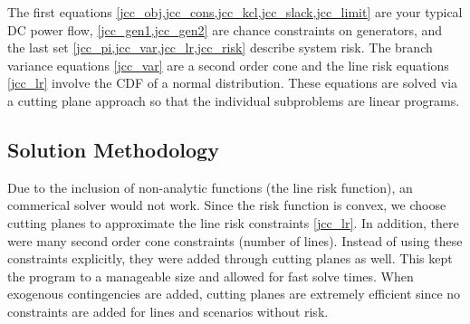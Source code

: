 The first equations \cref{jcc_obj,jcc_cons,jcc_kcl,jcc_slack,jcc_limit} are your typical DC power flow, \cref{jcc_gen1,jcc_gen2} are chance constraints on generators, and the last set \cref{jcc_pi,jcc_var,jcc_lr,jcc_risk} describe system risk.  The branch variance equations \ref{jcc_var} are a second order cone and the line risk equations \ref{jcc_lr} involve the CDF of a normal distribution.  These equations are solved via a cutting plane approach so that the individual subproblems are linear programs.


\subsection{Solution Methodology}\label{solutionmethodology}
Due to the inclusion of non-analytic functions (the line risk function), an commerical solver would not work.  Since the risk function is convex, we choose cutting planes to approximate the line risk constraints \ref{jcc_lr}.  In addition, there were many second order cone constraints (number of lines).  Instead of using these constraints explicitly, they were added through cutting planes as well.  This kept the program to a manageable size and allowed for fast solve times.  When exogenous contingencies are added, cutting planes are extremely efficient since no constraints are added for lines and scenarios without risk.

